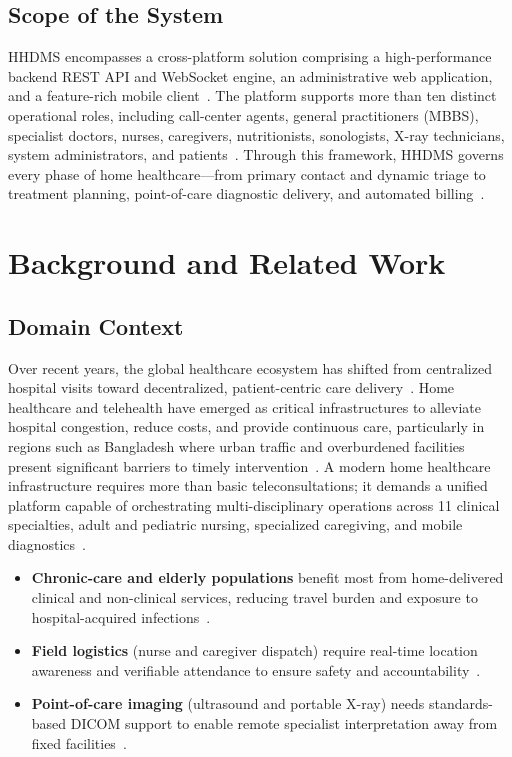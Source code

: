 \documentclass[conference]{IEEEtran}
\begin{document}
\subsection{Scope of the System}
HHDMS encompasses a cross-platform solution comprising a high-performance backend REST API and WebSocket engine, an administrative web application, and a feature-rich mobile client~\cite{srs2026}. The platform supports more than ten distinct operational roles, including call-center agents, general practitioners (MBBS), specialist doctors, nurses, caregivers, nutritionists, sonologists, X-ray technicians, system administrators, and patients~\cite{srs2026}. Through this framework, HHDMS governs every phase of home healthcare---from primary contact and dynamic triage to treatment planning, point-of-care diagnostic delivery, and automated billing~\cite{srs2026}.

\section{Background and Related Work}

\subsection{Domain Context}
Over recent years, the global healthcare ecosystem has shifted from centralized hospital visits toward decentralized, patient-centric care delivery~. Home healthcare and telehealth have emerged as critical infrastructures to alleviate hospital congestion, reduce costs, and provide continuous care, particularly in regions such as Bangladesh where urban traffic and overburdened facilities present significant barriers to timely intervention~\cite{srs2026}. A modern home healthcare infrastructure requires more than basic teleconsultations; it demands a unified platform capable of orchestrating multi-disciplinary operations across 11 clinical specialties, adult and pediatric nursing, specialized caregiving, and mobile diagnostics~\cite{srs2026}.

\begin{itemize}
\item \textbf{Chronic-care and elderly populations} benefit most from home-delivered clinical and non-clinical services, reducing travel burden and exposure to hospital-acquired infections~.
\item \textbf{Field logistics} (nurse and caregiver dispatch) require real-time location awareness and verifiable attendance to ensure safety and accountability~\cite{zandbergen2009accuracy}.
\item \textbf{Point-of-care imaging} (ultrasound and portable X-ray) needs standards-based DICOM support to enable remote specialist interpretation away from fixed facilities~\cite{dicom2021, pacs2001}.
\end{itemize}
\end{document}
